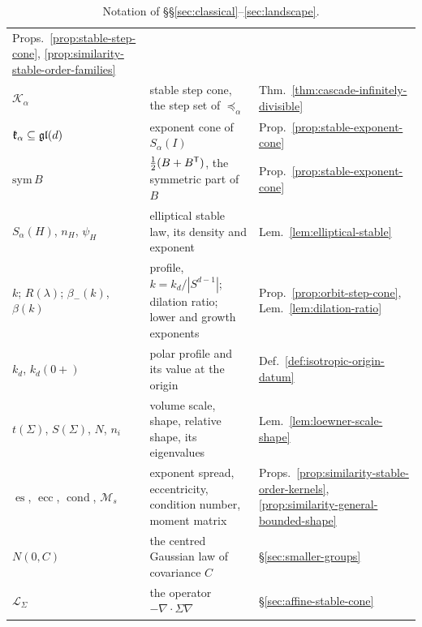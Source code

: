 \begin{table}[ht]
\begin{tabular}{@{}p{}p{}p{}@{}}
Props.~\ref{prop:stable-step-cone}, \ref{prop:similarity-stable-order-families} \\
$\mathcal K_\alpha$ & stable step cone, the step set of $\preceq_\alpha$ &
Thm.~\ref{thm:cascade-infinitely-divisible} \\
$\mathfrak k_\alpha \subseteq \mathfrak{gl}(d)$ & exponent cone of $S_\alpha(I)$ & Prop.~\ref{prop:stable-exponent-cone} \\
$\mathrm{sym}\,B$ & $\tfrac12(B + B^{\mathsf{T}})$, the symmetric part of $B$ & Prop.~\ref{prop:stable-exponent-cone} \\
$S_\alpha(H)$, $n_H$, $\psi_H$ & elliptical stable law, its \Levy{} density and exponent &
Lem.~\ref{lem:elliptical-stable} \\
$k$; $R(\lambda)$; $\beta_-(k)$, $\beta(k)$ & profile, $k = k_d/|S^{d-1}|$; dilation ratio; lower and
growth exponents & Prop.~\ref{prop:orbit-step-cone}, Lem.~\ref{lem:dilation-ratio} \\
$k_d$, $k_d(0{+})$ & polar profile and its value at the origin &
Def.~\ref{def:isotropic-origin-datum} \\
$t(\Sigma)$, $S(\Sigma)$, $N$, $n_i$ & volume scale, shape, relative shape, its eigenvalues &
Lem.~\ref{lem:loewner-scale-shape} \\
$\operatorname{es}$, $\operatorname{ecc}$, $\operatorname{cond}$, $\mathcal M_s$ & exponent spread,
eccentricity, condition number, moment matrix & Props.~\ref{prop:similarity-stable-order-kernels},
\ref{prop:similarity-general-bounded-shape} \\
$N(0, C)$ & the centred Gaussian law of covariance $C$ & \S\ref{sec:smaller-groups} \\
$\mathcal L_\Sigma$ & the operator $-\nabla\cdot\Sigma\nabla$ & \S\ref{sec:affine-stable-cone} \\
\bottomrule
\end{tabular}
\caption{Notation of \S\S\ref{sec:classical}--\ref{sec:landscape}.}
\label{tab:notation}
\end{table}

